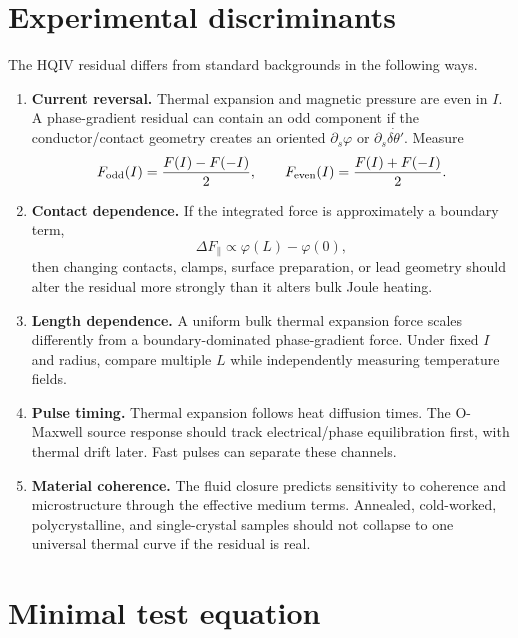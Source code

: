 \documentclass[11pt]{amsart}
\begin{document}
\section{Experimental discriminants}

The HQIV residual differs from standard backgrounds in the following ways.

\begin{enumerate}
\item \textbf{Current reversal.}
Thermal expansion and magnetic pressure are even in $I$. A phase-gradient residual can contain an odd component if the conductor/contact geometry creates an oriented $\partial_s\varphi$ or $\partial_s\dot{\delta\theta'}$. Measure
\[
F_{\rm odd}(I)=\frac{F(I)-F(-I)}{2},
\qquad
F_{\rm even}(I)=\frac{F(I)+F(-I)}{2}.
\]

\item \textbf{Contact dependence.}
If the integrated force is approximately a boundary term,
\[
\Delta F_\parallel\propto \varphi(L)-\varphi(0),
\]
then changing contacts, clamps, surface preparation, or lead geometry should alter the residual more strongly than it alters bulk Joule heating.

\item \textbf{Length dependence.}
A uniform bulk thermal expansion force scales differently from a boundary-dominated phase-gradient force. Under fixed $I$ and radius, compare multiple $L$ while independently measuring temperature fields.

\item \textbf{Pulse timing.}
Thermal expansion follows heat diffusion times. The O-Maxwell source response should track electrical/phase equilibration first, with thermal drift later. Fast pulses can separate these channels.

\item \textbf{Material coherence.}
The fluid closure predicts sensitivity to coherence and microstructure through the effective medium terms. Annealed, cold-worked, polycrystalline, and single-crystal samples should not collapse to one universal thermal curve if the residual is real.
\end{enumerate}

\section{Minimal test equation}
\end{document}
